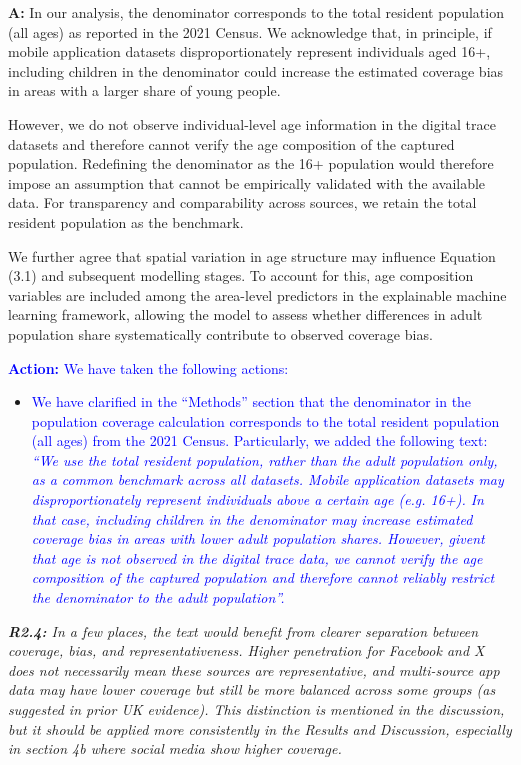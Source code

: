 \documentclass[
  letterpaper,
  DIV=11,
  numbers=noendperiod]{scrartcl}
\begin{document}
\setlength{\leftskip}{0.5cm}\textbf{A:} In our analysis, the denominator
corresponds to the total resident population (all ages) as reported in
the 2021 Census. We acknowledge that, in principle, if mobile
application datasets disproportionately represent individuals aged 16+,
including children in the denominator could increase the estimated
coverage bias in areas with a larger share of young people.

However, we do not observe individual-level age information in the
digital trace datasets and therefore cannot verify the age composition
of the captured population. Redefining the denominator as the 16+
population would therefore impose an assumption that cannot be
empirically validated with the available data. For transparency and
comparability across sources, we retain the total resident population as
the benchmark.

We further agree that spatial variation in age structure may influence
Equation (3.1) and subsequent modelling stages. To account for this, age
composition variables are included among the area-level predictors in
the explainable machine learning framework, allowing the model to assess
whether differences in adult population share systematically contribute
to observed coverage bias.

\setlength{\leftskip}{0.5cm}\textcolor{blue}{\textbf{Action:} We have taken the following actions:}

\vspace{-3mm} \begin{itemize}[noitemsep, topsep=0pt]
\item \textcolor{blue}{ We have clarified in the ``Methods'' section that the denominator in the population coverage calculation corresponds to the total resident population (all ages) from the 2021 Census. Particularly, we added the following text: \textit{``We use the total resident population, rather than the adult population only, as a common benchmark across all datasets. Mobile application datasets may disproportionately represent individuals above a certain age (e.g. 16+). In that case, including children in the denominator may increase estimated coverage bias in areas with lower adult population shares. However, givent that age is not observed in the digital trace data, we cannot verify the age composition of the captured population and therefore cannot reliably restrict the denominator to the adult population''.}}
\end{itemize}

\setlength{\leftskip}{0cm}\textit{\textbf{R2.4:} In a few places, the text would benefit from clearer separation between coverage, bias, and representativeness. Higher penetration for Facebook and X does not necessarily mean these sources are representative, and multi-source app data may have lower coverage but still be more balanced across some groups (as suggested in prior UK evidence). This distinction is mentioned in the discussion, but it should be applied more consistently in the Results and Discussion, especially in section 4b where social media show higher coverage.}
\end{document}
